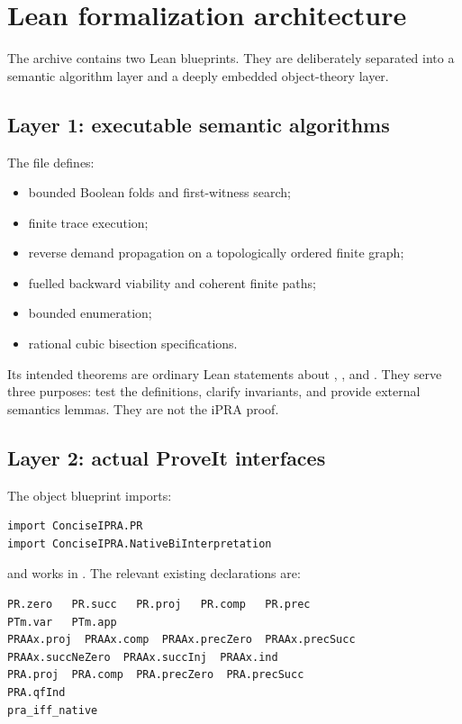 \section{Lean formalization architecture}

The archive contains two Lean blueprints.  They are deliberately separated
into a semantic algorithm layer and a deeply embedded object-theory layer.

\subsection{Layer 1: executable semantic algorithms}

The file  defines:
\begin{itemize}[leftmargin=1.6em]
\item bounded Boolean folds and first-witness search;
\item finite trace execution;
\item reverse demand propagation on a topologically ordered finite graph;
\item fuelled backward viability and coherent finite paths;
\item bounded enumeration;
\item rational cubic bisection specifications.
\end{itemize}
Its intended theorems are ordinary Lean statements about ,
, and .  They serve three purposes: test the definitions,
clarify invariants, and provide external semantics lemmas.  They are not the
iPRA proof.

\subsection{Layer 2: actual ProveIt interfaces}

The object blueprint imports:
\begin{lstlisting}[language={}]
import ConciseIPRA.PR
import ConciseIPRA.NativeBiInterpretation
\end{lstlisting}
and works in .  The relevant existing declarations
are:
\begin{lstlisting}[language={}]
PR.zero   PR.succ   PR.proj   PR.comp   PR.prec
PTm.var   PTm.app
PRAAx.proj  PRAAx.comp  PRAAx.precZero  PRAAx.precSucc
PRAAx.succNeZero  PRAAx.succInj  PRAAx.ind
PRA.proj  PRA.comp  PRA.precZero  PRA.precSucc
PRA.qfInd
pra_iff_native
\end{lstlisting}

